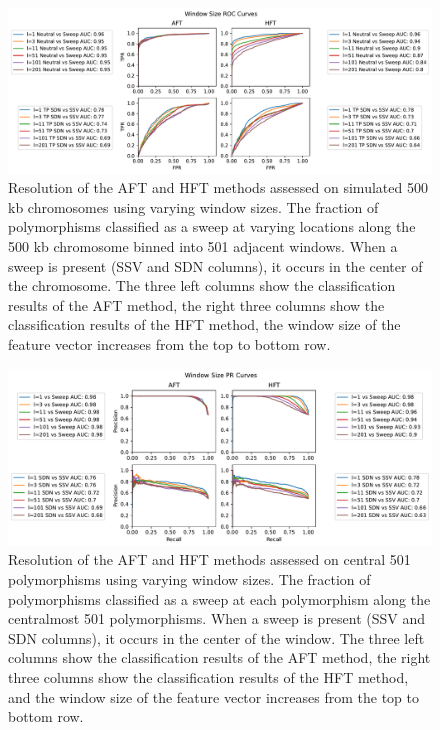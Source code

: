 \begin{figure}
    \centering
    \includegraphics[width=\textwidth]{figures/ap1/S12_Win_Sizes_ROC.pdf}
    \caption[Resolution of the AFT and HFT methods assessed on simulated 500 kb chromosomes using varying window sizes.]{Resolution of the AFT and HFT methods assessed on simulated 500 kb chromosomes using varying window sizes. The fraction of polymorphisms classified as a sweep at varying locations along the 500 kb chromosome binned into 501 adjacent windows. When a sweep is present (SSV and SDN columns), it occurs in the center of the chromosome. The three left columns show the classification results of the AFT method, the right three columns show the classification results of the HFT method, the window size of the feature vector increases from the top to bottom row.}
    \label{fig:S12_Win_Sizes_ROC}
\end{figure}

\begin{figure}
    \centering
    \includegraphics[width=\textwidth]{figures/ap1/S13_Win_Sizes_PR.pdf}
    \caption[Resolution of the AFT and HFT methods assessed on central 501 polymorphisms using varying window sizes.]{Resolution of the AFT and HFT methods assessed on central 501 polymorphisms using varying window sizes. The fraction of polymorphisms classified as a sweep at each polymorphism along the centralmost 501 polymorphisms. When a sweep is present (SSV and SDN columns), it occurs in the center of the window. The three left columns show the classification results of the AFT method, the right three columns show the classification results of the HFT method, and the window size of the feature vector increases from the top to bottom row.}
    \label{fig:S13_Win_Sizes_PR}
\end{figure}

